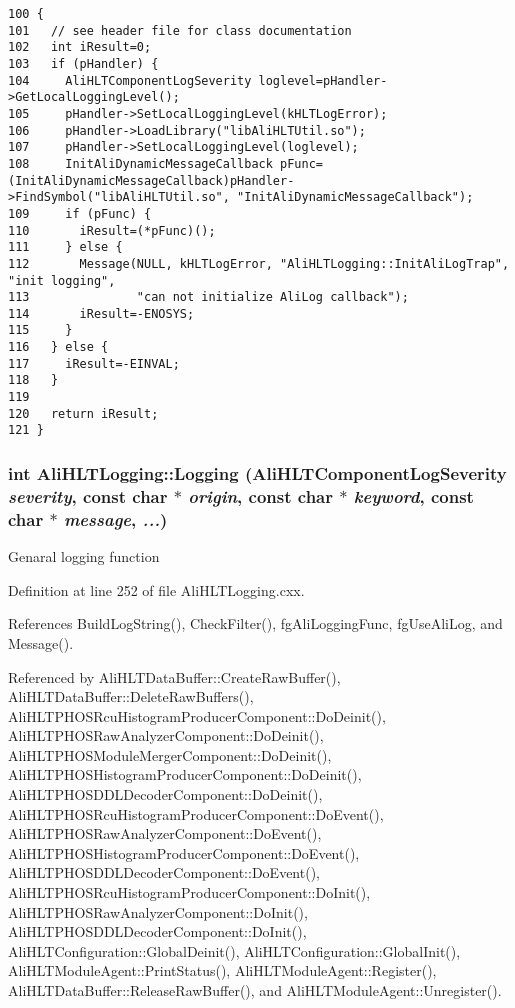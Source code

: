\footnotesize\begin{verbatim}100 {
101   // see header file for class documentation
102   int iResult=0;
103   if (pHandler) {
104     AliHLTComponentLogSeverity loglevel=pHandler->GetLocalLoggingLevel();
105     pHandler->SetLocalLoggingLevel(kHLTLogError);
106     pHandler->LoadLibrary("libAliHLTUtil.so");
107     pHandler->SetLocalLoggingLevel(loglevel);
108     InitAliDynamicMessageCallback pFunc=(InitAliDynamicMessageCallback)pHandler->FindSymbol("libAliHLTUtil.so", "InitAliDynamicMessageCallback"); 
109     if (pFunc) {
110       iResult=(*pFunc)();
111     } else {
112       Message(NULL, kHLTLogError, "AliHLTLogging::InitAliLogTrap", "init logging",
113               "can not initialize AliLog callback");
114       iResult=-ENOSYS;
115     }
116   } else {
117     iResult=-EINVAL;
118   }
119   
120   return iResult;
121 }
\end{verbatim}\normalsize 


\subsubsection{\setlength{\rightskip}{0pt plus 5cm}int Ali\-HLTLogging::Logging ({\bf Ali\-HLTComponent\-Log\-Severity} {\em severity}, const char $\ast$ {\em origin}, const char $\ast$ {\em keyword}, const char $\ast$ {\em message},  {\em ...})}\label{classAliHLTLogging_a7}


Genaral logging function 

Definition at line 252 of file Ali\-HLTLogging.cxx.

References Build\-Log\-String(), Check\-Filter(), fg\-Ali\-Logging\-Func, fg\-Use\-Ali\-Log, and Message().

Referenced by Ali\-HLTData\-Buffer::Create\-Raw\-Buffer(), Ali\-HLTData\-Buffer::Delete\-Raw\-Buffers(), Ali\-HLTPHOSRcu\-Histogram\-Producer\-Component::Do\-Deinit(), Ali\-HLTPHOSRaw\-Analyzer\-Component::Do\-Deinit(), Ali\-HLTPHOSModule\-Merger\-Component::Do\-Deinit(), Ali\-HLTPHOSHistogram\-Producer\-Component::Do\-Deinit(), Ali\-HLTPHOSDDLDecoder\-Component::Do\-Deinit(), Ali\-HLTPHOSRcu\-Histogram\-Producer\-Component::Do\-Event(), Ali\-HLTPHOSRaw\-Analyzer\-Component::Do\-Event(), Ali\-HLTPHOSHistogram\-Producer\-Component::Do\-Event(), Ali\-HLTPHOSDDLDecoder\-Component::Do\-Event(), Ali\-HLTPHOSRcu\-Histogram\-Producer\-Component::Do\-Init(), Ali\-HLTPHOSRaw\-Analyzer\-Component::Do\-Init(), Ali\-HLTPHOSDDLDecoder\-Component::Do\-Init(), Ali\-HLTConfiguration::Global\-Deinit(), Ali\-HLTConfiguration::Global\-Init(), Ali\-HLTModule\-Agent::Print\-Status(), Ali\-HLTModule\-Agent::Register(), Ali\-HLTData\-Buffer::Release\-Raw\-Buffer(), and Ali\-HLTModule\-Agent::Unregister().


